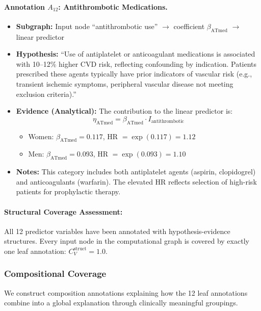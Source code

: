 \documentclass{article}
\begin{document}
\paragraph{Annotation $A_{12}$: Antithrombotic Medications.}
\begin{itemize}
    \item \textbf{Subgraph:} Input node ``antithrombotic use'' $\rightarrow$ coefficient $\beta_{\text{ATmed}}$ $\rightarrow$ linear predictor
    \item \textbf{Hypothesis:} ``Use of antiplatelet or anticoagulant medications is associated with 10--12\% higher CVD risk, reflecting confounding by indication. Patients prescribed these agents typically have prior indicators of vascular risk (e.g., transient ischemic symptoms, peripheral vascular disease not meeting exclusion criteria).''

    \item \textbf{Evidence (Analytical):} The contribution to the linear predictor is:
    \[
    \eta_{\text{ATmed}} = \beta_{\text{ATmed}} \cdot I_{\text{antithrombotic}}
    \]
    \begin{itemize}
        \item Women: $\beta_{\text{ATmed}} = 0.117$, HR $= \exp(0.117) = 1.12$
        \item Men: $\beta_{\text{ATmed}} = 0.093$, HR $= \exp(0.093) = 1.10$
    \end{itemize}
    \item \textbf{Notes:} This category includes both antiplatelet agents (aspirin, clopidogrel) and anticoagulants (warfarin). The elevated HR reflects selection of high-risk patients for prophylactic therapy.
\end{itemize}

\paragraph{Structural Coverage Assessment:} All 12 predictor variables have been annotated with hypothesis-evidence structures. Every input node in the computational graph is covered by exactly one leaf annotation: $C_V^{\text{struct}} = 1.0$.

\subsubsection{Compositional Coverage}

We construct composition annotations explaining how the 12 leaf annotations combine into a global explanation through clinically meaningful groupings.
\end{document}
